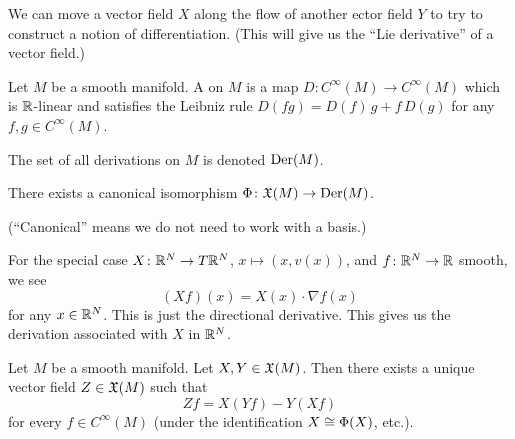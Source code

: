 \begin{node}
We can move a vector field $X$ along the flow of another ector field
$Y$ to try to construct a notion of differentiation. (This will give
us the ``Lie derivative'' of a vector field.)
\end{node}

\begin{definition}[Derivation]
Let $M$ be a smooth manifold. A  on $M$ is a map
$D\colon C^{\infty}(M)\to C^{\infty}(M)$ which is $\mathbb{R}$-linear and
satisfies the Leibniz rule $D(fg)=D(f)\,g+f\,D(g)$ for any $f,g\in C^{\infty}(M)$.
\end{definition}

\begin{notation}
The set of all derivations on $M$ is denoted $\operatorname{Der}(M)$.
\end{notation}

\begin{proposition}
There exists a canonical isomorphism $\Phi\colon\mathfrak{X}(M)\to\operatorname{Der}(M)$.
\end{proposition}

(``Canonical'' means we do not need to work with a basis.)

\begin{node}
For the special case $X\colon\mathbb{R}^{N}\to T\mathbb{R}^{N}$, $x\mapsto(x,v(x))$,
and $f\colon\mathbb{R}^{N}\to\mathbb{R}$ smooth, we see
\begin{equation}
(Xf)(x)=X(x)\cdot\nabla f(x)
\end{equation}
for any $x\in\mathbb{R}^{N}$. This is just the directional derivative. This
gives us the derivation associated with $X$ in $\mathbb{R}^{N}$.
\end{node}

\begin{corollary}
Let $M$ be a smooth manifold. Let $X,Y\in\mathfrak{X}(M)$. Then there exists
a unique vector field $Z\in\mathfrak{X}(M)$ such that
\begin{equation}
Zf=X(Yf)-Y(Xf)
\end{equation}
for every $f\in C^{\infty}(M)$ (under the identification
$X\cong\Phi(X)$, etc.).
\end{corollary}

